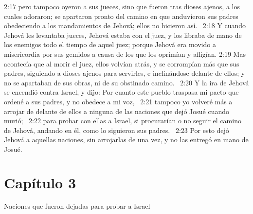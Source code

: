 2:17 pero tampoco oyeron a sus jueces, sino que fueron tras dioses ajenos, a los cuales adoraron; se apartaron pronto del camino en que anduvieron sus padres obedeciendo a los mandamientos de Jehová; ellos no hicieron así.  
2:18 Y cuando Jehová les levantaba jueces, Jehová estaba con el juez, y los libraba de mano de los enemigos todo el tiempo de aquel juez; porque Jehová era movido a misericordia por sus gemidos a causa de los que los oprimían y afligían. 
2:19 Mas acontecía que al morir el juez, ellos volvían atrás, y se corrompían más que sus padres, siguiendo a dioses ajenos para servirles, e inclinándose delante de ellos; y no se apartaban de sus obras, ni de su obstinado camino.  
2:20 Y la ira de Jehová se encendió contra Israel, y dijo: Por cuanto este pueblo traspasa mi pacto que ordené a sus padres, y no obedece a mi voz,  
2:21 tampoco yo volveré más a arrojar de delante de ellos a ninguna de las naciones que dejó Josué cuando murió;  
2:22 para probar con ellas a Israel, si procurarían o no seguir el camino de Jehová, andando en él, como lo siguieron sus padres.  
2:23 Por esto dejó Jehová a aquellas naciones, sin arrojarlas de una vez, y no las entregó en mano de Josué.  
\section*{Capítulo 3}
Naciones que fueron dejadas para probar a Israel  

